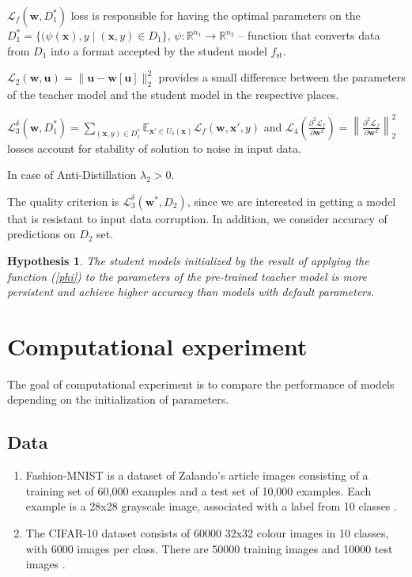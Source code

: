 \documentclass[80pt]{article}
\begin{document}
$\mathcal{L}_f(\mathbf{w}, D_1^*)$ loss is responsible for having the optimal parameters on the $D_1^* = \{(\psi (\textbf{x}), y \;|\; (\textbf{x}, y) \in D_1\}$, $\psi: \mathbb{R}^{n_1} \rightarrow \mathbb{R}^{n_2}$ -- function that converts data from $D_1$ into a format accepted by the student model $f_{\text{st}}$.

$\mathcal{L}_2 (\mathbf{w}, \mathbf{u}) = \|\textbf{u} - \textbf{w}[\textbf{u}]\|^2_2$ provides a small difference between the parameters of the teacher model and the student model in the respective places. 

$\mathcal{L}_3^\delta (\mathbf{w}, D_1^*) = \displaystyle \sum \limits_{(\textbf{x}, y) \in D_1^*} \displaystyle \mathbb{E}_{\textbf{x}' \in U_\delta(\textbf{x})} \mathcal{L}_f(\mathbf{w}, \textbf{x}', y)$  and  $\mathcal{L}_4 \left(\displaystyle \frac{\partial^2 \mathcal{L}_f}{\partial \mathbf{w}^2}\right) = \left\lVert \displaystyle \frac{\partial^2 \mathcal{L}_f}{\partial \mathbf{w}^2} \right\rVert^2_2$ losses account for stability of solution to noise in input data.

In case of Anti-Distillation $\lambda_2 >0$. 

The quality criterion is $\mathcal{L}_3^\delta (\mathbf{w}^*, D_2)$, since we are interested in getting a model that is resistant to input data corruption. In addition, we consider accuracy of predictions on $D_2$ set.

\newtheorem{hypothesis}{Hypothesis}
\begin{hypothesis}
The student models initialized by the result of applying the function (\ref{phi}) to the parameters of the pre-trained teacher model is more persistent and achieve higher accuracy than models with default parameters.
\end{hypothesis}

\section{Computational experiment}

The goal of computational experiment is to compare the performance of models depending on the initialization of parameters. 

\subsection{Data}

\begin{enumerate}
    \item Fashion-MNIST is a dataset of Zalando's article images consisting of a training set of 60,000 examples and a test set of 10,000 examples. Each example is a 28x28 grayscale image, associated with a label from 10 classes  \citep{fashionmnist}.
    
    \item The CIFAR-10 dataset consists of 60000 32x32 colour images in 10 classes, with 6000 images per class. There are 50000 training images and 10000 test images \citep{cifar10}.
\end{enumerate}
\end{document}
